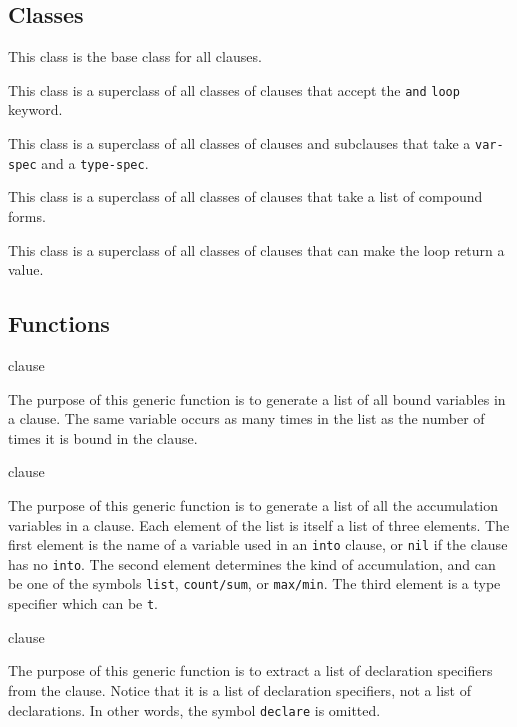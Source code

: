 \subsection{Classes}


This class is the base class for all clauses.


This class is a superclass of all classes of clauses that accept the \texttt{and}
\texttt{loop} keyword.


This class is a superclass of all classes of clauses and subclauses
that take a \texttt{var-spec} and a \texttt{type-spec}.


This class is a superclass of all classes of clauses that take a list
of compound forms.


This class is a superclass of all classes of clauses that can make the
loop return a value.

\subsection{Functions}

 {clause}

The purpose of this generic function is to generate a list of all
bound variables in a clause.  The same variable occurs as many times
in the list as the number of times it is bound in the clause.

 {clause}

The purpose of this generic function is to generate a list of all the
accumulation variables in a clause.  Each element of the list is
itself a list of three elements.  The first element is the name of a
variable used in an \texttt{into} clause, or \texttt{nil} if the
clause has no \texttt{into}.  The second element determines the kind
of accumulation, and can be one of the symbols \texttt{list},
\texttt{count/sum}, or \texttt{max/min}.  The third element is a type
specifier which can be \texttt{t}.

 {clause}

The purpose of this generic function is to extract a list of
declaration specifiers from the clause.  Notice that it is a list of
declaration specifiers, not a list of declarations.  In other words,
the symbol \texttt{declare} is omitted.

